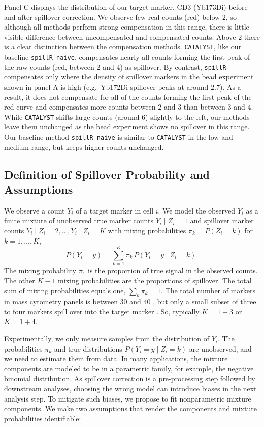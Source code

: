 \documentclass{bioinfo}
\begin{document}
Panel C displays the distribution of our target marker, CD3 (Yb173Di)
before and after spillover correction. We observe few real counts (red)
below \(2\), so although all methods perform strong compensation in this
range, there is little visible difference between uncompensated and
compensated counts. Above \(2\) there is a clear distinction between the
compensation methods. \texttt{CATALYST}, like our baseline
\texttt{spillR-naive}, compensates nearly all counts forming the first
peak of the raw counts (red, between \(2\) and \(4\)) as spillover. By
contrast, \texttt{spillR} compensates only where the density of
spillover markers in the bead experiment shown in panel A is high
(e.g.~Yb172Di spillover peaks at around \(2.7\)). As a result, it does
not compensate for all of the counts forming the first peak of the red
curve and compensates more counts between \(2\) and \(3\) than between
\(3\) and \(4\). While \texttt{CATALYST} shifts large counts (around
\(6\)) slightly to the left, our methods leave them unchanged as the
bead experiment shows no spillover in this range. Our baseline method
\texttt{spillR-naive} is similar to \texttt{CATALYST} in the low and
medium range, but keeps higher counts unchanged.

\subsection{Definition of Spillover Probability and Assumptions}

We observe a count \(Y_i\) of a target marker in cell \(i\). We model
the observed \(Y_i\) as a finite mixture \citep{mclachlan2019finite} of
unobserved true marker counts \(Y_i \mid Z_i = 1\) and spillover marker
counts \(Y_i \mid Z_i = 2, \dots, Y_i \mid Z_i = K\) with mixing
probabilities \(\pi_{k} = P(Z_i = k)\) for \(k = 1, \dots, K\), \[
P(Y_i = y) = \sum_{k = 1}^K \pi_k \, P(Y_i = y \mid Z_i = k).
\] The mixing probability \(\pi_1\) is the proportion of true signal in
the observed counts. The other \(K-1\) mixing probabilities are the
proportions of spillover. The total sum of mixing probabilities equals
one, \(\sum_k \pi_k = 1\). The total number of markers in mass cytometry
panels is between 30 and 40 \citep{bendall2011single}, but only a small
subset of three to four markers spill over into the target marker
\citep{catalyst}. So, typically \(K = 1+3\) or \(K = 1+4\).

Experimentally, we only measure samples from the distribution of
\(Y_i\). The probabilities \(\pi_k\) and true distributions
\(P(Y_i = y \mid Z_i = k)\) are unobserved, and we need to estimate them
from data. In many applications, the mixture components are modeled to
be in a parametric family, for example, the negative binomial
distribution. As spillover correction is a pre-processing step followed
by downstream analyses, choosing the wrong model can introduce biases in
the next analysis step. To mitigate such biases, we propose to fit
nonparametric mixture components. We make two assumptions that render
the components and mixture probabilities identifiable:
\end{document}

